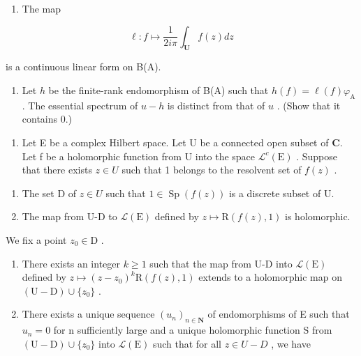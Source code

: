 \begin{enumerate}
\def\labelenumi{\alph{enumi})}
\tightlist
\item
  The map
\end{enumerate}

\[
\ell \colon f \mapsto \frac {1}{2 i \pi} \int_ {\mathbf {U}} f (z) d z
\]

is a continuous linear form on B(A).

\begin{enumerate}
\def\labelenumi{\alph{enumi})}
\setcounter{enumi}{1}
\tightlist
\item
  Let \(h\) be the finite-rank endomorphism of B(A) such that \(h(f) = \ell(f)\varphi_{\mathrm{A}}\) . The essential spectrum of \(u - h\) is distinct from that of \(u\) . (Show that it contains 0.)
\end{enumerate}

\begin{enumerate}
\def\labelenumi{\arabic{enumi})}
\setcounter{enumi}{2}
\tightlist
\item
  Let E be a complex Hilbert space. Let U be a connected open subset of \(\mathbf{C}\). Let f be a holomorphic function from U into the space \(\mathcal{L}^{c}(\mathrm{E})\) . Suppose that there exists \(z \in U\) such that 1 belongs to the resolvent set of \(f(z)\) .
\end{enumerate}

\begin{enumerate}
\def\labelenumi{\alph{enumi})}
\item
  The set D of \(z \in U\) such that \(1 \in \operatorname{Sp}(f(z))\) is a discrete subset of U.
\item
  The map from U-D to \(\mathcal{L}(\mathrm{E})\) defined by \(z\mapsto \mathrm{R}(f(z),1)\) is holomorphic.
\end{enumerate}

We fix a point \(z_0 \in \mathrm{D}\) .

\begin{enumerate}
\def\labelenumi{\alph{enumi})}
\setcounter{enumi}{2}
\item
  There exists an integer \(k \geqslant 1\) such that the map from U-D into \(\mathcal{L}(\mathrm{E})\) defined by \(z \mapsto (z - z_{0})^{k}\mathrm{R}(f(z), 1)\) extends to a holomorphic map on \((\mathrm{U}-\mathrm{D}) \cup \{z_{0}\}\) .
\item
  There exists a unique sequence \((u_{n})_{n\in\mathbf{N}}\) of endomorphisms of E such that \(u_{n}=0\) for n sufficiently large and a unique holomorphic function S from \((\mathrm{U}-\mathrm{D})\cup\{z_{0}\}\) into \(\mathcal{L}(\mathrm{E})\) such that for all \(z\in U-D\) , we have
\end{enumerate}


